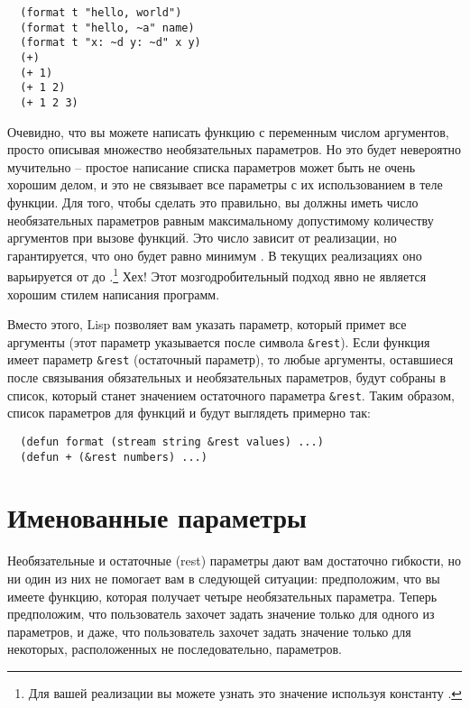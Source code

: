 \begin{lstlisting}
  (format t "hello, world")
  (format t "hello, ~a" name)
  (format t "x: ~d y: ~d" x y)
  (+)
  (+ 1)
  (+ 1 2)
  (+ 1 2 3)
\end{lstlisting}

Очевидно, что вы можете написать функцию с переменным числом аргументов, просто описывая
множество необязательных параметров.  Но это будет невероятно мучительно -- простое
написание списка параметров может быть не очень хорошим делом, и это не связывает все
параметры с их использованием в теле функции.  Для того, чтобы сделать это правильно, вы
должны иметь число необязательных параметров равным максимальному допустимому количеству
аргументов при вызове функций.  Это число зависит от реализации, но гарантируется, что оно
будет равно минимум .  В текущих реализациях оно варьируется от  до
.\footnote{Для вашей реализации вы можете узнать это значение используя
  константу .}  Хех!  Этот мозгодробительный подход явно не
является хорошим стилем написания программ.

Вместо этого, Lisp позволяет вам указать параметр, который примет все аргументы (этот
параметр указывается после символа \lstinline!&rest!).  Если функция имеет параметр
\lstinline!&rest! (остаточный параметр), то любые аргументы, оставшиеся после связывания
обязательных и необязательных параметров, будут собраны в список, который станет значением
остаточного параметра \lstinline!&rest!.  Таким образом, список параметров для функций
 и \code{+} будут выглядеть примерно так:

\begin{lstlisting}
  (defun format (stream string &rest values) ...)
  (defun + (&rest numbers) ...) 
\end{lstlisting}

\section{Именованные параметры}

Необязательные и остаточные (rest) параметры дают вам достаточно гибкости, но ни один из
них не помогает вам в следующей ситуации: предположим, что вы имеете функцию, которая
получает четыре необязательных параметра.  Теперь предположим, что пользователь захочет
задать значение только для одного из параметров, и даже, что пользователь захочет задать
значение только для некоторых, расположенных не последовательно, параметров.

